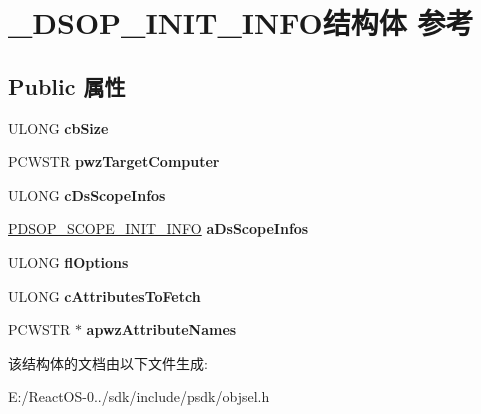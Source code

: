 \hypertarget{struct___d_s_o_p___i_n_i_t___i_n_f_o}{}\section{\+\_\+\+D\+S\+O\+P\+\_\+\+I\+N\+I\+T\+\_\+\+I\+N\+F\+O结构体 参考}
\label{struct___d_s_o_p___i_n_i_t___i_n_f_o}
\subsection*{Public 属性}
\begin{DoxyCompactItemize}
\item 
\mbox{\label{struct___d_s_o_p___i_n_i_t___i_n_f_o_a471cff9595d493bc8fb484efba4736a0}} 
U\+L\+O\+NG {\bfseries cb\+Size}
\item 
\mbox{\label{struct___d_s_o_p___i_n_i_t___i_n_f_o_ad79f7a5cd0118acc7cead119b112c536}} 
P\+C\+W\+S\+TR {\bfseries pwz\+Target\+Computer}
\item 
\mbox{\label{struct___d_s_o_p___i_n_i_t___i_n_f_o_ab2a37ff474ed3257747d17b1b4ec4aaa}} 
U\+L\+O\+NG {\bfseries c\+Ds\+Scope\+Infos}
\item 
\mbox{\label{struct___d_s_o_p___i_n_i_t___i_n_f_o_aa3f0608c5ab6f92e01ca4d30eeaecf83}} 
\hyperlink{struct___d_s_o_p___s_c_o_p_e___i_n_i_t___i_n_f_o}{P\+D\+S\+O\+P\+\_\+\+S\+C\+O\+P\+E\+\_\+\+I\+N\+I\+T\+\_\+\+I\+N\+FO} {\bfseries a\+Ds\+Scope\+Infos}
\item 
\mbox{\label{struct___d_s_o_p___i_n_i_t___i_n_f_o_af2bd797a246811b6be67c17e90483af3}} 
U\+L\+O\+NG {\bfseries fl\+Options}
\item 
\mbox{\label{struct___d_s_o_p___i_n_i_t___i_n_f_o_a04c6ef297202e178c22415f48c68b15c}} 
U\+L\+O\+NG {\bfseries c\+Attributes\+To\+Fetch}
\item 
\mbox{\label{struct___d_s_o_p___i_n_i_t___i_n_f_o_a8b5389a24e29f2b2a302e3920a0ec7fb}} 
P\+C\+W\+S\+TR $\ast$ {\bfseries apwz\+Attribute\+Names}
\end{DoxyCompactItemize}


该结构体的文档由以下文件生成\+:\begin{DoxyCompactItemize}
\item 
E\+:/\+React\+O\+S-\/0../sdk/include/psdk/objsel.\+h\end{DoxyCompactItemize}

